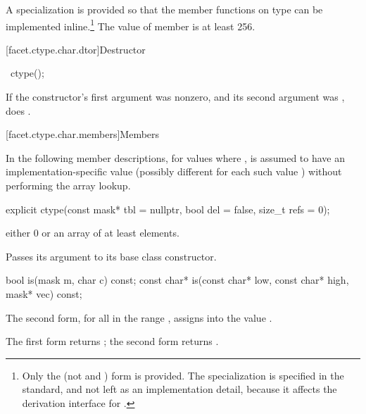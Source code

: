 \pnum
A specialization
is provided so that the member functions on type
can be implemented
inline.\footnote{Only the
(not
and
)
form is provided.
The specialization is specified in the standard, and not left as an
implementation detail, because it affects the derivation interface for
.}
The  value of member
is at least 256.

[facet.ctype.char.dtor]{Destructor}

%
\begin{itemdecl}
~ctype();
\end{itemdecl}

\begin{itemdescr}
\pnum
\effects
If the constructor's first argument was nonzero, and its second argument
was , does
.
\end{itemdescr}

[facet.ctype.char.members]{Members}

\pnum
{}%
In the following member descriptions, for
values  where ,
 is assumed to have an
implementation-specific value (possibly different for each
such value ) without performing the array lookup.

%
\begin{itemdecl}
explicit ctype(const mask* tbl = nullptr, bool del = false, size_t refs = 0);
\end{itemdecl}

\begin{itemdescr}
\pnum
\requires
{} either 0 or an array of at least
elements.

\pnum
\effects
Passes its  argument to its base class constructor.
\end{itemdescr}

%
\begin{itemdecl}
bool        is(mask m, char c) const;
const char* is(const char* low, const char* high, mask* vec) const;
\end{itemdecl}

\begin{itemdescr}
\pnum
\effects
The second form, for all
in the range
,
assigns
into
the value
.

\pnum
\returns
The first form returns
;
the second form returns .
\end{itemdescr}

